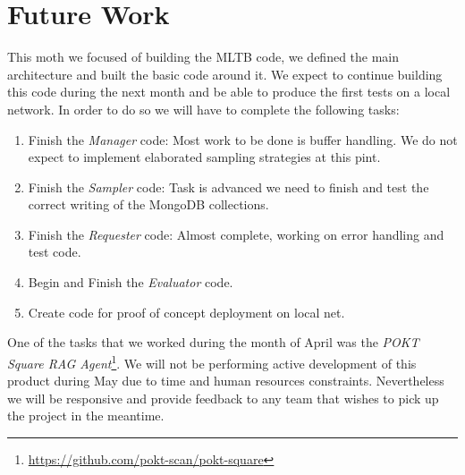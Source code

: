 \section{Future Work}\label{sec:z}

This moth we focused of building the \gls{MLTB} code, we defined the main architecture and built the basic code around it. 
We expect to continue building this code during the next month and be able to produce the first tests on a local network.
In order to do so we will have to complete the following tasks:
\begin{enumerate}
    \item Finish the \emph{Manager} code: Most work to be done is buffer handling. We do not expect to implement elaborated sampling strategies at this pint.
    \item Finish the \emph{Sampler} code: Task is advanced we need to finish and test the correct writing of the MongoDB collections.
    \item Finish the \emph{Requester} code: Almost complete, working on error handling and test code.
    \item Begin and Finish the \emph{Evaluator} code.
    \item Create code for proof of concept deployment on local net.
\end{enumerate}

One of the tasks that we worked during the month of April was the \emph{POKT Square RAG Agent}\footnote{\url{https://github.com/pokt-scan/pokt-square}}. We will not be performing active development of this product during May due to time and human resources constraints. Nevertheless we will be responsive and provide feedback to any team that wishes to pick up the project in the meantime.